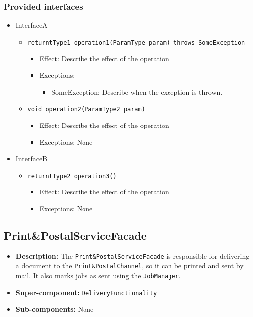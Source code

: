 \documentclass[a4paper,10pt]{article}
\begin{document}
\subsubsection*{Provided interfaces}
\begin{itemize}
    \item InterfaceA
    \begin{itemize}
        \item \texttt{returntType1 operation1(ParamType param) throws SomeException}
        \begin{itemize}
            \item Effect: Describe the effect of the operation
            \item Exceptions:
            \begin{itemize}
                \item SomeException: Describe when the exception is thrown.
            \end{itemize}
		\end{itemize}
        \item \texttt{void operation2(ParamType2 param)}
        \begin{itemize}
            \item Effect: Describe the effect of the operation
            \item Exceptions: None
        \end{itemize}
    \end{itemize}

    \item InterfaceB
    \begin{itemize}
        \item \texttt{returntType2 operation3()}
        \begin{itemize}
            \item Effect: Describe the effect of the operation
            \item Exceptions: None
        \end{itemize}
    \end{itemize}
\end{itemize}

\subsection{Print\&PostalServiceFacade}
\begin{itemize}
    \item \textbf{Description:} The \texttt{Print\&PostalServiceFacade} is responsible for delivering a document to the \texttt{Print\&PostalChannel}, so it can be printed and sent by mail. It also marks jobs as sent using the \texttt{JobManager}.
    \item \textbf{Super-component:} \texttt{DeliveryFunctionality}
    \item \textbf{Sub-components:} None
\end{itemize}
\end{document}
